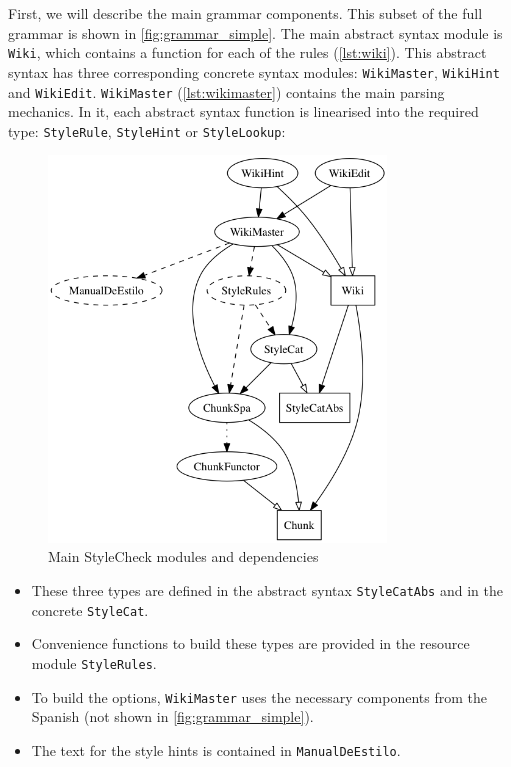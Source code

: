 First, we will describe the main grammar components. This subset of the full grammar is shown in \autoref{fig:grammar_simple}. The main abstract syntax module is \texttt{Wiki}, which contains a function for each of the rules (\autoref{lst:wiki}). This abstract syntax has three corresponding concrete syntax modules: \texttt{WikiMaster}, \texttt{WikiHint} and \texttt{WikiEdit}. \texttt{WikiMaster} (\autoref{lst:wikimaster}) contains the main parsing mechanics. In it, each abstract syntax function is linearised into the required type: \texttt{StyleRule}, \texttt{StyleHint} or \texttt{StyleLookup}:

\begin{figure}[h]
\myfloatalign
\includegraphics[width=0.8\textwidth]{img/grammar/grammar_simple}
\caption{Main StyleCheck modules and dependencies}
\label{fig:grammar_simple}
\end{figure}

\begin{itemize}
    \item These three types are defined in the abstract syntax \texttt{StyleCatAbs} and in the concrete \texttt{StyleCat}. 
    \item Convenience functions to build these types are provided in the resource module \texttt{StyleRules}.
    \item To build the options, \texttt{WikiMaster} uses the necessary components from the Spanish  (not shown in \autoref{fig:grammar_simple}). 
    \item The text for the style hints is contained in \texttt{ManualDeEstilo}.
\end{itemize}

